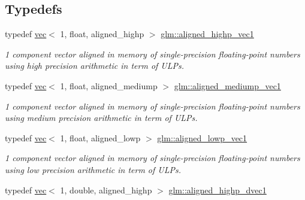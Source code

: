 \subsection*{Typedefs}
\begin{DoxyCompactItemize}
\item 
\mbox{\label{group__gtc__type__aligned_ga8da7535c1fe488b2b9a29c0c05e7b17e}} 
typedef \hyperlink{structglm_1_1vec}{vec}$<$ 1, float, aligned\+\_\+highp $>$ \hyperlink{group__gtc__type__aligned_ga8da7535c1fe488b2b9a29c0c05e7b17e}{glm\+::aligned\+\_\+highp\+\_\+vec1}
\begin{DoxyCompactList}\small\item\em 1 component vector aligned in memory of single-\/precision floating-\/point numbers using high precision arithmetic in term of U\+L\+Ps. \end{DoxyCompactList}\item 
\mbox{\label{group__gtc__type__aligned_ga8751a96bb361e9f007e5555eb90e3230}} 
typedef \hyperlink{structglm_1_1vec}{vec}$<$ 1, float, aligned\+\_\+mediump $>$ \hyperlink{group__gtc__type__aligned_ga8751a96bb361e9f007e5555eb90e3230}{glm\+::aligned\+\_\+mediump\+\_\+vec1}
\begin{DoxyCompactList}\small\item\em 1 component vector aligned in memory of single-\/precision floating-\/point numbers using medium precision arithmetic in term of U\+L\+Ps. \end{DoxyCompactList}\item 
\mbox{\label{group__gtc__type__aligned_ga9a7ee43ec4c9d0c59740b96c10aee479}} 
typedef \hyperlink{structglm_1_1vec}{vec}$<$ 1, float, aligned\+\_\+lowp $>$ \hyperlink{group__gtc__type__aligned_ga9a7ee43ec4c9d0c59740b96c10aee479}{glm\+::aligned\+\_\+lowp\+\_\+vec1}
\begin{DoxyCompactList}\small\item\em 1 component vector aligned in memory of single-\/precision floating-\/point numbers using low precision arithmetic in term of U\+L\+Ps. \end{DoxyCompactList}\item 
\mbox{\label{group__gtc__type__aligned_ga85671dcb7eef983b5035273fe78dd963}} 
typedef \hyperlink{structglm_1_1vec}{vec}$<$ 1, double, aligned\+\_\+highp $>$ \hyperlink{group__gtc__type__aligned_ga85671dcb7eef983b5035273fe78dd963}{glm\+::aligned\+\_\+highp\+\_\+dvec1}

\end{DoxyCompactItemize}

